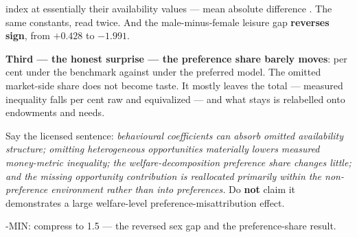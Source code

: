 \documentclass[10pt,aspectratio=169]{beamer}
\begin{document}
\begin{frame}
{index at essentially their availability values --- mean absolute difference
\BenchConstMAD. The same constants, read twice. And the male-minus-female leisure
gap \textbf{reverses sign}, from $+0.428$ to $-1.991$. \par\medskip
\textbf{Third --- the honest surprise --- the preference share barely moves}:
\BenchSharePrefRUMB{} per cent under the benchmark against \BenchSharePrefRURO{}
under the preferred model. The omitted market-side share does not become taste. It
mostly leaves the total --- measured inequality falls \BenchInequalityDropRaw{} per
cent raw and \BenchInequalityDropEqv{} equivalized --- and what stays is relabelled
onto endowments and needs. \par\medskip
Say the licensed sentence: \emph{behavioural coefficients can absorb omitted
availability structure; omitting heterogeneous opportunities materially lowers
measured money-metric inequality; the welfare-decomposition preference share
changes little; and the missing opportunity contribution is reallocated primarily
within the non-preference environment rather than into preferences.} Do \textbf{not}
claim it demonstrates a large welfare-level preference-misattribution effect. \par{}-MIN: compress to 1.5 --- the reversed sex gap and the preference-share result.}
\end{frame}
\end{document}
